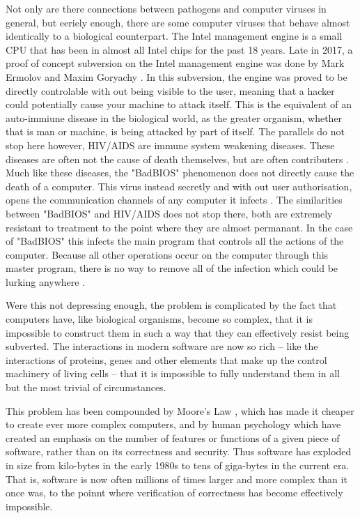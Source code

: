 Not only are there connections between pathogens and computer viruses in general, but eeriely enough, there are some computer viruses that behave almost identically to a biological counterpart. The Intel management engine is a small CPU that has been in almost all Intel chips for the past 18 years. Late in 2017, a proof of concept subversion on the Intel management engine was done by  Mark Ermolov and Maxim Goryachy \cite{Hackaday}. In this subversion, the engine was proved to be directly controlable with out being visible to the user, meaning that a hacker could potentially cause your machine to attack itself. This is the equivalent of an auto-immiune disease in the biological world, as the greater organism, whether that is man or machine, is being attacked by part of itself. The parallels do not stop here however, HIV/AIDS are immune system weakening diseases. These diseases are often not the cause of death themselves, but are often contributers \cite{ggHIV}. Much like these diseases, the "BadBIOS" phenomenon does not directly cause the death of a computer. This virus instead secretly and with out user authorisation, opens the communication channels of any computer it infects \cite{Reference5}. The similarities between "BadBIOS" and HIV/AIDS does not stop there, both are extremely resistant to treatment to the point where they are almost permanant. In the case of "BadBIOS" this infects the main program that controls all the actions of the computer. Because all other operations occur on the computer through this master program, there is no way to remove all of the infection which could be lurking anywhere \cite{Reference5}.

Were this not depressing enough, the problem is complicated by the fact that computers have, like biological organisms,
become so complex, that it is impossible to construct them in such a way that they can effectively resist being subverted.
The interactions in modern software are now so rich -- like the interactions of proteins, genes and other elements that make up
the control machinery of living cells -- that it is impossible to fully understand them in all but the most trivial of circumstances.

This problem has been compounded by Moore's Law \cite{Moore}, which has made it cheaper to create ever more complex computers, and
by human psychology which have created an emphasis on the number of features or functions of a given piece of software, rather than
on its correctness and security.  Thus software has exploded in size from kilo-bytes in the early 1980s to tens of giga-bytes in
the current era. That is, software is now often millions of times larger and more complex than it once was, to the poinnt where
verification of correctness has become effectively impossible.

